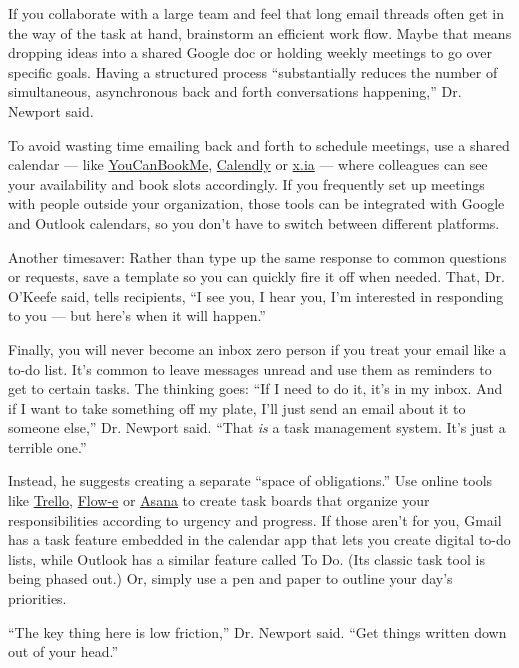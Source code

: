 If you collaborate with a large team and feel that long email threads
often get in the way of the task at hand, brainstorm an efficient work
flow. Maybe that means dropping ideas into a shared Google doc or
holding weekly meetings to go over specific goals. Having a structured
process ``substantially reduces the number of simultaneous, asynchronous
back and forth conversations happening,'' Dr. Newport said.

To avoid wasting time emailing back and forth to schedule meetings, use
a shared calendar --- like \href{https://youcanbook.me/}{YouCanBookMe},
\href{https://calendly.com/}{Calendly} or
\href{https://x.ai/?utm_source=zapier.com\&utm_medium=referral\&utm_campaign=zapier}{x.ia}
--- where colleagues can see your availability and book slots
accordingly. If you frequently set up meetings with people outside your
organization, those tools can be integrated with Google and Outlook
calendars, so you don't have to switch between different platforms.

Another timesaver: Rather than type up the same response to common
questions or requests, save a template so you can quickly fire it off
when needed. That, Dr. O'Keefe said, tells recipients, ``I see you, I
hear you, I'm interested in responding to you --- but here's when it
will happen.''

Finally, you will never become an inbox zero person if you treat your
email like a to-do list. It's common to leave messages unread and use
them as reminders to get to certain tasks. The thinking goes: ``If I
need to do it, it's in my inbox. And if I want to take something off my
plate, I'll just send an email about it to someone else,'' Dr. Newport
said. ``That \emph{is} a task management system. It's just a terrible
one.''

Instead, he suggests creating a separate ``space of obligations.'' Use
online tools like \href{https://trello.com/en-US}{Trello},
\href{https://flow-e.com/}{Flow-e} or
\href{https://asana.com/guide/get-started/begin/adding-assigning-tasks}{Asana}
to create task boards that organize your responsibilities according to
urgency and progress. If those aren't for you, Gmail has a task feature
embedded in the calendar app that lets you create digital to-do lists,
while Outlook has a similar feature called To Do. (Its classic task tool
is being phased out.) Or, simply use a pen and paper to outline your
day's priorities.

``The key thing here is low friction,'' Dr. Newport said. ``Get things
written down out of your head.''

